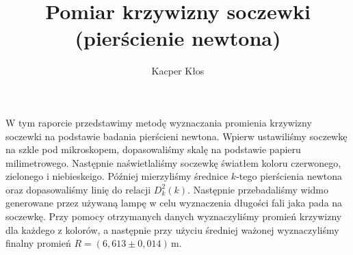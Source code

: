 \documentclass[12pt]{article}
\title{Pomiar krzywizny soczewki (pierścienie newtona)}
\author{Kacper Kłos}
\begin{document}
\maketitle

W tym raporcie przedstawimy metodę wyznaczania promienia krzywizny soczewki na podstawie badania pierścieni newtona. Wpierw ustawiliśmy soczewkę na szkle pod mikroskopem, dopasowaliśmy skalę na podstawie papieru milimetrowego. Następnie naświetlaliśmy soczewkę światłem koloru czerwonego, zielonego i niebieskeigo. Później mierzyliśmy średnice \(k\)-tego pierścienia newtona oraz dopasowaliśmy linię do relacji \(D_k^2(k)\). Następnie przebadaliśmy widmo generowane przez używaną lampę w celu wyznaczenia długości fali jaka pada na soczewkę. Przy pomocy otrzymanych danych wyznaczyliśmy promień krzywizny dla każdego z kolorów, a następnie przy użyciu średniej ważonej wyznaczyliśmy finalny promień \(R = (6{,}613 \pm 0{,}014) \, \mathrm{m}\).

\newpage
\end{document}
